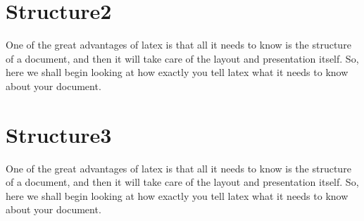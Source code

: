 	\section{Structure2}
	One of the great advantages of latex is that all it needs to know is
	the structure of a document, and then it will take care of the layout
	and presentation itself.  So, here we shall begin looking at how exactly
	you tell latex what it needs to know about your document.

	\section{Structure3}
	One of the great advantages of latex is that all it needs to know is
	the structure of a document, and then it will take care of the layout
	and presentation itself.  So, here we shall begin looking at how exactly
	you tell latex what it needs to know about your document.

